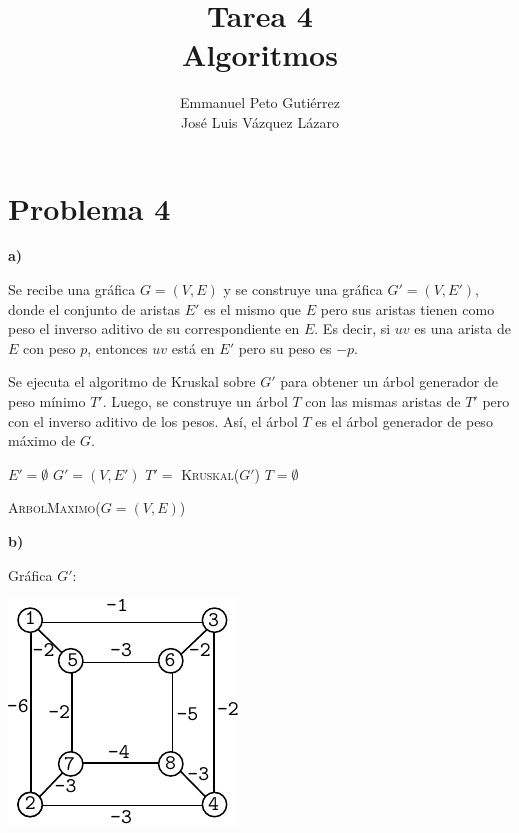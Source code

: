 \documentclass{article}
\title{Tarea 4\\Algoritmos}
\author{Emmanuel Peto Gutiérrez\\José Luis Vázquez Lázaro}
\begin{document}
\maketitle

\section*{Problema 4}

\textbf{a)}

Se recibe una gráfica $G=(V,E)$ y se construye una gráfica $G' = (V,E')$, donde el conjunto de aristas $E'$ es el mismo que $E$ pero sus aristas tienen como peso el inverso aditivo de su correspondiente en $E$. Es decir, si $uv$ es una arista de $E$ con peso $p$, entonces $uv$ está en $E'$ pero su peso es $-p$.

Se ejecuta el algoritmo de Kruskal sobre $G'$ para obtener un árbol generador de peso mínimo $T'$. Luego, se construye un árbol $T$ con las mismas aristas de $T'$ pero con el inverso aditivo de los pesos. Así, el árbol $T$ es el árbol generador de peso máximo de $G$.

\begin{algorithm}[htbp]

$E' = \emptyset$\;
$G' = (V, E')$\;
$T' =$ \textsc{Kruskal}($G'$)\;
$T = \emptyset$\;

\caption{\textsc{ArbolMaximo($G=(V,E)$)}}

\end{algorithm}

\textbf{b)}

Gráfica $G'$:

\begin{center}
\includegraphics[scale=1]{kruskal/p1}
\end{center}
\end{document}
